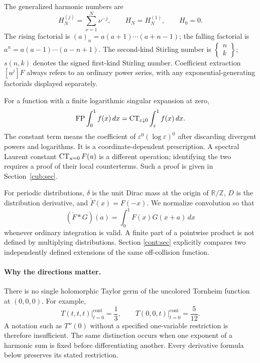 The generalized harmonic numbers are
\[
 H_N^{(j)}=\sum_{\nu=1}^N\nu^{-j},\qquad H_N=H_N^{(1)},\qquad H_0=0.
\]
The rising factorial is $(a)_n=a(a+1)\cdots(a+n-1)$; the falling
factorial is $a^{\underline n}=a(a-1)\cdots(a-n+1)$.
The second-kind Stirling number is
$\left\{\begin{smallmatrix}n\\k\end{smallmatrix}\right\}$;
$s(n,k)$ denotes the signed first-kind Stirling number.
Coefficient extraction $[u^j]F$ always refers to an ordinary power
series, with any exponential-generating factorials displayed
separately.

For a function with a finite logarithmic singular expansion at zero,
\begin{equation}\label{scope:FP}
 \operatorname*{FP}\int_0^1 f(x)\,dx
   =\operatorname{CT}_{\varepsilon\downarrow0}\int_\varepsilon^1 f(x)\,dx.
\end{equation}
The constant term means the coefficient of
$\varepsilon^0(\log\varepsilon)^0$ after discarding divergent powers
and logarithms. It is a coordinate-dependent prescription. A spectral
Laurent constant $\operatorname{CT}_{u=0}F(u)$ is a different operation; identifying
the two requires a proof of their local counterterms. Such a proof is
given in Section~\ref{cub:sec}.

For periodic distributions, $\delta$ is the unit Dirac mass at the
origin of $\mathbb R/\mathbb Z$, $D$ is the distribution derivative,
and $\check F(x)=F(-x)$. We normalize convolution so that
\[
 (\check F*G)(a)=\int_0^1 F(x)G(x+a)\,dx
\]
whenever ordinary integration is valid. A finite part of a pointwise
product is not defined by multiplying distributions. Section
\ref{cont:sec} explicitly compares two independently defined
extensions of the same off-collision function.

\paragraph{Why the directions matter.}
There is no single holomorphic Taylor germ of the uncolored Tornheim
function at $(0,0,0)$. For example,
\[
 T(t,t,t)\big|_{t=0}^{\mathrm{cont}}=\frac13,\qquad
 T(0,0,t)\big|_{t=0}^{\mathrm{cont}}=\frac5{12}.
\]
A notation such as $T''(0)$ without a specified one-variable
restriction is therefore insufficient. The same distinction occurs
when one exponent of a harmonic sum is fixed before differentiating
another. Every derivative formula below preserves its stated
restriction.
